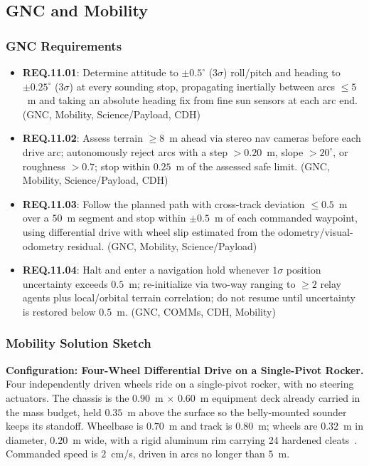 \documentclass[11pt]{article}
\newcommand{\reqid}[1]{\textbf{#1}}
\begin{document}
\subsection{GNC and Mobility}

\subsubsection{GNC Requirements}
\begin{itemize}[leftmargin=*]
    \item \reqid{REQ.11.01}: Determine attitude to $\pm 0.5^\circ$ ($3\sigma$) roll/pitch and
    heading to $\pm 0.25^\circ$ ($3\sigma$) at every sounding stop, propagating inertially
    between arcs $\leq 5$~m and taking an absolute heading fix from fine sun sensors at each arc
    end. (GNC, Mobility, Science/Payload, CDH)
    \item \reqid{REQ.11.02}: Assess terrain $\geq 8$~m ahead via stereo nav cameras before
    each drive arc; autonomously reject arcs with a step $>0.20$~m, slope $>20^\circ$, or
    roughness $>0.7$; stop within $0.25$~m of the assessed safe limit. (GNC, Mobility,
    Science/Payload, CDH)
    \item \reqid{REQ.11.03}: Follow the planned path with cross-track deviation $\leq 0.5$~m
    over a $50$~m segment and stop within $\pm 0.5$~m of each commanded waypoint, using
    differential drive with wheel slip estimated from the odometry/visual-odometry residual.
    (GNC, Mobility, Science/Payload)
    \item \reqid{REQ.11.04}: Halt and enter a navigation hold whenever $1\sigma$ position
    uncertainty exceeds $0.5$~m; re-initialize via two-way ranging to $\geq 2$ relay agents plus
    local/orbital terrain correlation; do not resume until uncertainty is restored below
    $0.5$~m. (GNC, COMMs, CDH, Mobility)
\end{itemize}

\subsubsection{Mobility Solution Sketch}
\textbf{Configuration: Four-Wheel Differential Drive on a Single-Pivot Rocker.} Four
independently driven wheels ride on a single-pivot rocker, with no steering actuators. The
chassis is the $0.90$~m $\times$ $0.60$~m equipment deck already carried in the mass budget, held
$0.35$~m above the surface so the belly-mounted sounder keeps its standoff. Wheelbase is
$0.70$~m and track is $0.80$~m; wheels are $0.32$~m in diameter, $0.20$~m wide, with a rigid
aluminum rim carrying 24 hardened cleats~\cite{mslWheels}. Commanded speed is $2$~cm/s, driven in
arcs no longer than $5$~m.
\end{document}
